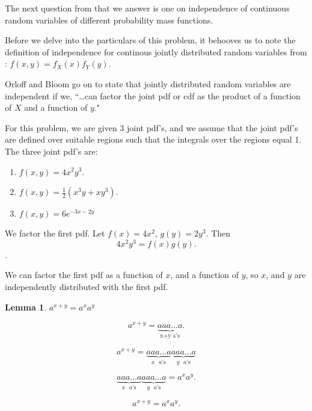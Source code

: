 \documentclass[a4paper,11pt]{article}
\newtheorem{lem}[thm]{Lemma}
\begin{document}
The next question from \cite{slides7} that we answer is one on independence
of continuous random variables of different probability mass functions.

Before we delve into the particulars of this problem, it behooves us to note the
definition of independence for continous jointly distributed random variables from
\cite{reading7}: $f \left(x, y \right)=f_{X}\left(x \right) f_{Y}\left(y \right)$.

Orloff and Bloom go on to state that jointly distributed random variables are
independent if we, ``\ldots can factor the joint pdf or cdf as the product of
a function of $X$ and a function of $y$."

For this problem, we are given 3 joint pdf's, and we assume that the joint
pdf's are defined over suitable regions such that the integrals over the
regions equal 1. The three joint pdf's are:
\begin{enumerate}
  \item $f \left( x, y \right) = 4x^2y^3$.
  \item $f \left( x, y \right) = \frac{1}{2} \left( x^3y + xy^3 \right)$.
  \item $f \left( x, y \right) = 6e^{-3x-2y}$
\end{enumerate}

We factor the first pdf.  Let $f\left(x \right) = 4x^2$,
$g\left(y \right)= 2y^3$.  Then
\begin{equation}
4x^2y^3 = f\left(x \right) g\left( y \right).
\end{equation}.

We can factor the first pdf as a function of $x$, and a function of $y$, so
$x$, and $y$ are independently  distributed with the first pdf.

\begin{lem}
$a^{x+y} = a^xa^y$

\begin{equation}
a^{x+y} = \underbrace{aaa \ldots a}_{\text{x+y a's}}.
\end{equation}


\begin{equation}
a^{x+y} = \underbrace{aaa \ldots a}_{x\text{ }a\text{'s}}
\underbrace{aaa \ldots a}_{y\text{ }a\text{'s}}
\end{equation}

\begin{equation}
\underbrace{aaa \ldots a}_{x\text{ }a\text{'s}}
\underbrace{aaa \ldots a}_{y\text{ }a\text{'s}}
=a^xa^y.
\end{equation}


\begin{equation}
a^{x+y} = a^xa^y.
\end{equation}
\end{lem}
\end{document}
